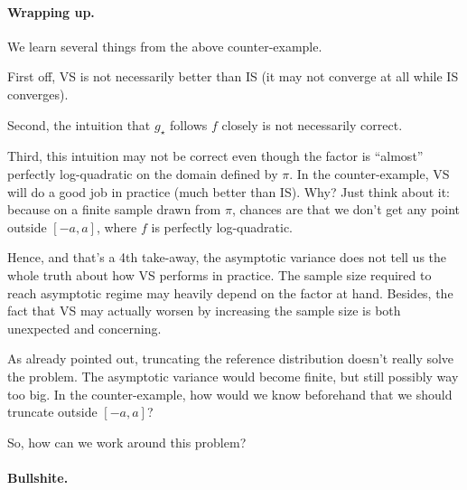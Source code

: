 \documentclass{article}
\begin{document}
\paragraph{Wrapping up.}

We learn several things from the above counter-example.

First off, VS is not necessarily better than IS (it may not converge at all while IS converges).

Second, the intuition that $g_\star$ follows $f$ closely is not necessarily correct. 

Third, this intuition may not be correct even though the factor is ``almost'' perfectly log-quadratic on the domain defined by $\pi$. In the counter-example, VS will do a good job in practice (much better than IS). Why? Just think about it: because on a finite sample drawn from $\pi$, chances are that we don't get any point outside $[-a,a]$, where $f$ is perfectly log-quadratic. 


Hence, and that's a 4th take-away, the asymptotic variance does not tell us the whole truth about how VS performs in practice. The sample size required to reach asymptotic regime may heavily depend on the factor at hand. Besides, the fact that VS may actually worsen by increasing the sample size is both unexpected and concerning.

As already pointed out, truncating the reference distribution doesn't really solve the problem. The asymptotic variance would become finite, but still possibly way too big. In the counter-example, how would we know beforehand that we should truncate outside $[-a,a]$?

So, how can we work around this problem?







\paragraph{Bullshite.}
\end{document}
